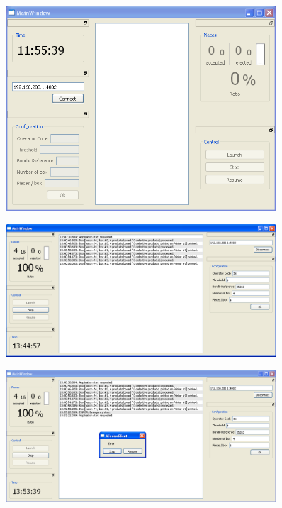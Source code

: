 \documentclass{beamer}
\begin{document}
	\begin{frame}
        \begin{figure}
	        \centering
	        \includegraphics[width=0.9\textwidth]{img/connection.png}
        \end{figure}
	\end{frame}

	\begin{frame}
        \begin{figure}
	        \centering
	        \includegraphics[width=0.9\textwidth]{img/log.png}
        \end{figure}
	\end{frame}

	\begin{frame}
        \begin{figure}
	        \centering
	        \includegraphics[width=0.9\textwidth]{img/error.png}
        \end{figure}
	\end{frame}
\end{document}
